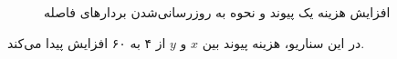  \begin{figure}[H]
\centering
{}
\caption{افزایش هزینه یک پیوند و نحوه به روزرسانی‌شدن بردار‌های فاصله}
\label{fig:badnews}
\end{figure}
 
در این سناریو، هزینه پیوند بین $x$ و $y$ از ۴ به ۶۰ افزایش پیدا می‌کند. 
  
